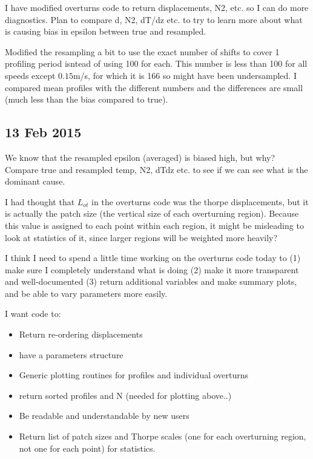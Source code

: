 \documentclass[11pt]{article}
\begin{document}
I have modified overturns code to return displacements, N2, etc. so I can do more diagnostics. Plan to compare d, N2, dT/dz etc. to try to learn more about what is causing bias in epsilon between true and resampled.


\vspace{1cm}

Modified the resampling a bit to use the exact number of shifts to cover 1 profiling period isntead of using 100 for each. This number is less than 100 for all speeds except $0.15$m/s, for which it is 166 so might have been undersampled. I compared mean profiles with the different numbers and the differences are small (much less than the bias compared to true).


\clearpage
\newpage
\subsection{13 Feb 2015}

We know that the resampled epsilon (averaged) is biased high, but why? Compare true and resampled temp, N2, dTdz etc. to see if we can see what is the dominant cause.

\vspace{1cm}

I had thought that $L_{ot}$ in the overturns code was the thorpe displacements, but it is actually the patch size (the vertical size of each overturning region). Because this value is assigned to each point within each region, it might be misleading to look at statistics of it, since larger regions will be weighted more heavily?

\vspace{1cm}

I think I need to spend a little time working on the overturns code today to (1) make sure I completely understand what is doing (2) make it more transparent and well-documented (3) return additional variables and make summary plots, and be able to vary parameters more easily.

\vspace{1cm}

I want code to:

\begin{itemize}
\item Return re-ordering displacements
\item have a parameters structure
\item Generic plotting routines for profiles and individual overturns
\item return sorted profiles and N (needed for plotting above..)
\item Be readable and understandable by new users
\item Return list of patch sizes and Thorpe scales (one for each overturning region, not one for each point) for statistics.
\end{itemize}
\end{document}
